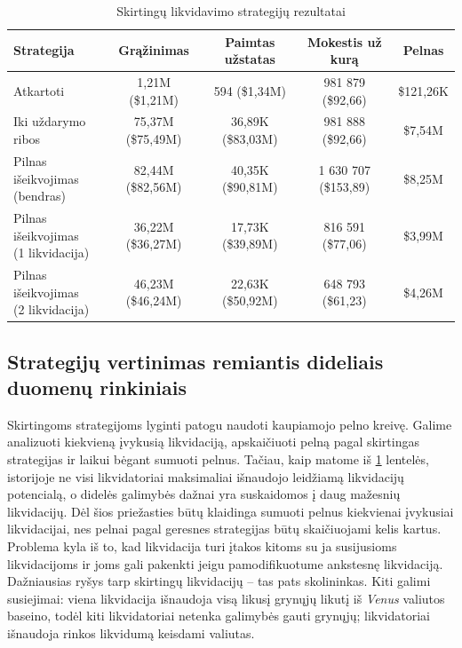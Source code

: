 \documentclass[]{VUMIFTemplateClass}
\begin{document}
\begin{table}[h!]
  \centering
  \begin{tabular}{|l|c|c|c|c|}
  \hline
  \textbf{Strategija}                & \textbf{Grąžinimas}    & \textbf{Paimtas užstatas}   & \textbf{Mokestis už kurą}            & \textbf{Pelnas}              \\ \hline
  Atkartoti                         & 1,21M (\$1,21M)         & 594 (\$1,34M)                & 981 879 (\$92,66)            & \$121,26K                    \\ \hline
  Iki uždarymo ribos                   & 75,37M (\$75,49M)       & 36,89K (\$83,03M)            & 981 888 (\$92,66)            & \$7,54M                      \\ \hline
  \makecell[cl]{Pilnas išeikvojimas \\ (bendras)}                   & 82,44M (\$82,56M)       & 40,35K (\$90,81M)            & 1 630 707 (\$153,89)         & \$8,25M                      \\ \hline
  \makecell[cl]{Pilnas išeikvojimas \\ (1 likvidacija)}                         & 36,22M (\$36,27M)       & 17,73K (\$39,89M)            & 816 591 (\$77,06)            & \$3,99M                      \\ \hline
  \makecell[cl]{Pilnas išeikvojimas \\ (2 likvidacija)}                        & 46,23M (\$46,24M)       & 22,63K (\$50,92M)            & 648 793 (\$61,23)            & \$4,26M                      \\ \hline
  \end{tabular}
  \caption{Skirtingų likvidavimo strategijų rezultatai}
  \label{liquidation_example_comp}
  \end{table}

\subsection{Strategijų vertinimas remiantis dideliais duomenų rinkiniais}
\label{sec:lyginimas_daug}

Skirtingoms strategijoms lyginti patogu naudoti kaupiamojo pelno kreivę. Galime analizuoti kiekvieną įvykusią likvidaciją, apskaičiuoti pelną pagal skirtingas strategijas ir laikui bėgant sumuoti pelnus. Tačiau, kaip matome iš \ref{liquidation_example_comp} lentelės, istorijoje ne visi likvidatoriai maksimaliai išnaudojo leidžiamą likvidacijų potencialą, o didelės galimybės dažnai yra suskaidomos į daug mažesnių likvidacijų. Dėl šios priežasties būtų klaidinga sumuoti pelnus kiekvienai įvykusiai likvidacijai, nes pelnai pagal geresnes strategijas būtų skaičiuojami kelis kartus. Problema kyla iš to, kad likvidacija turi įtakos kitoms su ja susijusioms likvidacijoms ir joms gali pakenkti jeigu pamodifikuotume ankstesnę likvidaciją. Dažniausias ryšys tarp skirtingų likvidacijų – tas pats skolininkas. Kiti galimi susiejimai: viena likvidacija išnaudoja visą likusį grynųjų likutį iš \textit{Venus} valiutos baseino, todėl kiti likvidatoriai netenka galimybės gauti grynųjų; likvidatoriai išnaudoja rinkos likvidumą keisdami valiutas.
\end{document}
